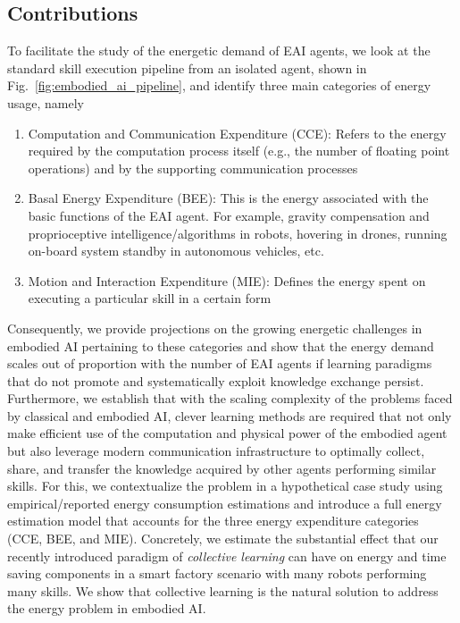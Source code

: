 \subsection{Contributions}
To facilitate the study of the energetic demand of EAI agents, we look at the standard skill execution pipeline from an isolated agent, shown in Fig.~\ref{fig:embodied_ai_pipeline}, and identify three main categories of energy usage, namely
\begin{enumerate}
	\item Computation and Communication Expenditure (CCE): Refers to the energy required by the computation process itself (e.g., the number of floating point operations) and by the supporting communication processes
	\item Basal Energy Expenditure (BEE): This is the energy associated with the basic functions of the EAI agent. For example, gravity compensation and proprioceptive intelligence/algorithms in robots, hovering in drones, running on-board system standby in autonomous vehicles, etc.
	\item Motion and Interaction Expenditure (MIE): Defines the energy spent on executing a particular skill in a certain form
\end{enumerate}
Consequently, we provide projections on the growing energetic challenges in embodied AI pertaining to these categories and show that the energy demand scales out of proportion with the number of EAI agents if learning paradigms that do not promote and systematically exploit knowledge exchange persist. Furthermore, we establish that with the scaling complexity of the problems faced by classical and embodied AI, clever learning methods are required that not only make efficient use of the computation and physical power of the embodied agent but also leverage modern communication infrastructure to optimally collect, share, and transfer the knowledge acquired by other agents performing similar skills. For this, we contextualize the problem in a hypothetical case study using empirical/reported energy consumption estimations and introduce a full energy estimation model that accounts for the three energy expenditure categories (CCE, BEE, and MIE). Concretely, we estimate the substantial effect that our recently introduced paradigm of \emph{collective learning} can have on energy and time saving components in a smart factory scenario with many robots performing many skills. We show that collective learning is the natural solution to address the energy problem in embodied AI.

